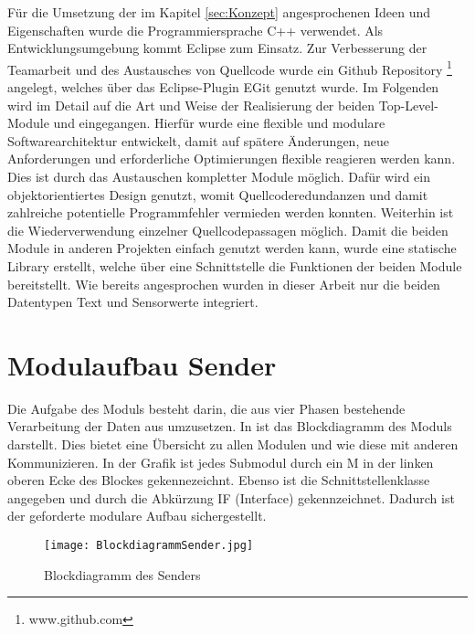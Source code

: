 
Für die Umsetzung der im Kapitel \ref{sec:Konzept} angesprochenen Ideen und
Eigenschaften wurde die Programmiersprache C++ verwendet. Als Entwicklungsumgebung kommt
Eclipse zum Einsatz. Zur Verbesserung der Teamarbeit und des Austausches
von Quellcode wurde ein Github Repository \footnote{www.github.com} angelegt,
welches über das Eclipse-Plugin EGit genutzt wurde. \newline Im Folgenden wird
im Detail auf die Art und Weise der Realisierung der beiden Top-Level-Module
 und  eingegangen. Hierfür wurde eine flexible und
modulare Softwarearchitektur entwickelt, damit auf spätere Änderungen, neue Anforderungen
und erforderliche Optimierungen flexible reagieren werden kann. Dies ist durch
das Austauschen kompletter Module möglich.
Dafür wird ein objektorientiertes Design genutzt, womit Quellcoderedundanzen und damit
zahlreiche potentielle Programmfehler vermieden werden konnten.
Weiterhin ist die Wiederverwendung einzelner Quellcodepassagen möglich.\newline
Damit die beiden Module in anderen Projekten einfach genutzt werden kann, wurde
eine statische Library erstellt, welche über eine Schnittstelle die Funktionen
der beiden Module bereitstellt. Wie bereits angesprochen wurden in dieser Arbeit
nur die beiden Datentypen Text und Sensorwerte integriert.

\section{Modulaufbau Sender}

Die Aufgabe des Moduls  besteht darin, die aus vier Phasen
bestehende Verarbeitung der Daten aus  umzusetzen. In
 ist das Blockdiagramm des Moduls 
darstellt.
Dies bietet eine Übersicht zu allen Modulen und wie diese mit anderen
Kommunizieren. In der Grafik ist jedes Submodul durch ein M in der linken
oberen Ecke des Blockes gekennezeichnt. Ebenso ist die Schnittstellenklasse angegeben
und durch die Abkürzung IF (Interface) gekennzeichnet. Dadurch ist der geforderte modulare
Aufbau sichergestellt.

\begin{figure}[H]
\centering
\texttt{[image: BlockdiagrammSender.jpg]} %
\caption{Blockdiagramm des Senders}
\label{fig:BlockdiagrammSender}
\end{figure}

